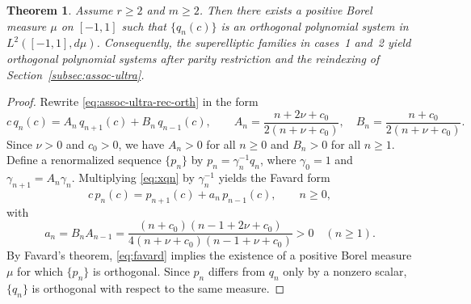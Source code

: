 \documentclass[10pt,a4paper]{amsart}
\newtheorem{theorem}{Theorem}
\begin{document}
\begin{theorem}\label{thm:orthogonality}
Assume $r\ge2$ and $m\ge2$. Then there exists a positive Borel measure $\mu$ on $[-1,1]$
such that $\{q_n(c)\}$ is an orthogonal polynomial system in $L^2([-1,1],d\mu)$.
Consequently, the superelliptic families in cases~1 and~2 yield orthogonal polynomial
systems after parity restriction and the reindexing of Section~\ref{subsec:assoc-ultra}.
\end{theorem}

\begin{proof}
Rewrite \eqref{eq:assoc-ultra-rec-orth} in the form
\begin{equation}\label{eq:xqn}
c\,q_n(c)=A_n\,q_{n+1}(c)+B_n\,q_{n-1}(c),
\qquad
A_n=\frac{n+2\nu+c_0}{2(n+\nu+c_0)},\quad
B_n=\frac{n+c_0}{2(n+\nu+c_0)}.
\end{equation}
Since $\nu>0$ and $c_0>0$, we have $A_n>0$ for all $n\ge0$ and $B_n>0$ for all $n\ge1$.
Define a renormalized sequence $\{p_n\}$ by $p_n=\gamma_n^{-1}q_n$, where $\gamma_0=1$ and
$\gamma_{n+1}=A_n\gamma_n$. Multiplying \eqref{eq:xqn} by $\gamma_n^{-1}$ yields the
Favard form
\begin{equation}\label{eq:favard}
c\,p_n(c)=p_{n+1}(c)+a_n\,p_{n-1}(c),\qquad n\ge0,
\end{equation}
with
\[
a_n=B_nA_{n-1}=\frac{(n+c_0)(n-1+2\nu+c_0)}{4(n+\nu+c_0)(n-1+\nu+c_0)}>0\quad(n\ge1).
\]
By Favard's theorem, \eqref{eq:favard} implies the existence of a positive Borel measure
$\mu$ for which $\{p_n\}$ is orthogonal. Since $p_n$ differs from $q_n$ only by a nonzero
scalar, $\{q_n\}$ is orthogonal with respect to the same measure.
\end{proof}
\end{document}
